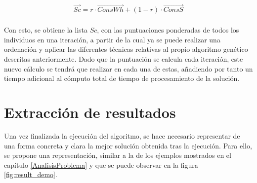 \documentclass[11pt,spanish,listoffigures,listoftables]{tfgetsinf}
\begin{document}
\begin{align*}
    \Vec{Sc} = r \cdot \Vec{ConsWh} + (1-r) \cdot \Vec{ConsS} \\
\end{align*}
    
Con esto, se obtiene la lista $Sc$, con las puntuaciones ponderadas de todos los individuos en una iteración, a partir de la cual ya se puede realizar una ordenación y aplicar las diferentes técnicas relativas al propio algoritmo genético descritas anteriormente. Dado que la puntuación se calcula cada iteración, este nuevo cálculo se tendrá que realizar en cada una de estas, añadiendo por tanto un tiempo adicional al cómputo total de tiempo de procesamiento de la solución.

\newpage
\section{Extracción de resultados}
\label{results_visualization}
Una vez finalizada la ejecución del algoritmo, se hace necesario representar de una forma concreta y clara la mejor solución obtenida tras la ejecución. Para ello, se propone una representación, similar a la de los ejemplos mostrados en el capítulo \ref{AnalisisProblema} y que se puede observar en la figura \ref{fig:result_demo}.
\end{document}
